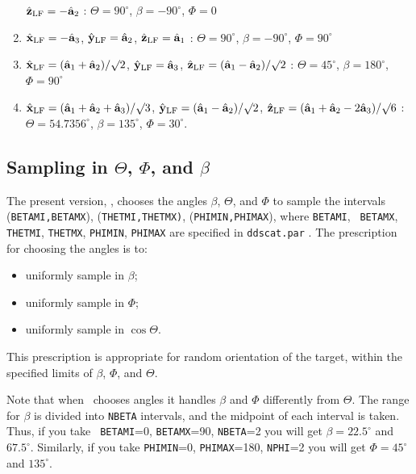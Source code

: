 \begin{enumerate}
     $\hat{\bf z}_{\rm LF}=-{\hat{\bf a}}_2$ : 
	$\Theta= 90^\circ$, $\beta=-90^\circ$, $\Phi=  0$
\item$\hat{\bf x}_{\rm LF}=-{\hat{\bf a}}_3$, 
     $\hat{\bf y}_{\rm LF}= {\hat{\bf a}}_2$, 
     $\hat{\bf z}_{\rm LF}= {\hat{\bf a}}_1$ : 
	$\Theta= 90^\circ$, $\beta=-90^\circ$, $\Phi= 90^\circ$
\item$\hat{\bf x}_{\rm LF}=({\hat{\bf a}}_1+{\hat{\bf a}}_2)/\surd2$, 
     $\hat{\bf y}_{\rm LF}={\hat{\bf a}}_3$, 
     $\hat{\bf z}_{\rm LF}=({\hat{\bf a}}_1-{\hat{\bf a}}_2)/\surd2$ : 
	$\Theta=45^\circ$, $\beta=180^\circ$, $\Phi=90^\circ$
\item$\hat{\bf x}_{\rm LF}=({\hat{\bf a}}_1+{\hat{\bf a}}_2+{\hat{\bf a}}_3)/\surd3$, 
	$\hat{\bf y}_{\rm LF}=({\hat{\bf a}}_1-{\hat{\bf a}}_2)/\surd2$, 
	$\hat{\bf z}_{\rm LF}=({\hat{\bf a}}_1+{\hat{\bf a}}_2-2{\hat{\bf a}}_3)/\surd6$ :\\
	$\Theta=54.7356^\circ$, $\beta=135^\circ$, $\Phi=30^\circ$.
\end{enumerate}

\subsection{ Sampling in $\Theta$, $\Phi$, and $\beta$\label{subsec:sampling}}
The present version, \ddscatv, chooses the angles $\beta$,
$\Theta$, and $\Phi$ to sample the intervals ({\tt BETAMI,BETAMX}),
({\tt THETMI,THETMX)}, ({\tt PHIMIN,PHIMAX}), where {\tt BETAMI}, {\tt
BETAMX}, {\tt THETMI}, {\tt THETMX}, {\tt PHIMIN}, {\tt PHIMAX} are
specified in {\tt ddscat.par} .  The prescription for choosing the
angles is to:
\begin{itemize}
\item uniformly sample in $\beta$;
\item uniformly sample in $\Phi$;
\item uniformly sample in $\cos\Theta$.
\end{itemize}
This prescription is appropriate for random orientation of the target,
within the specified limits of $\beta$, $\Phi$, and $\Theta$.

Note that when \ddscatv\ chooses angles it handles $\beta$ and
$\Phi$ differently from $\Theta$.
The range for $\beta$ is divided into {\tt NBETA} intervals, and the
midpoint of each interval is taken.  Thus, if you take {\tt
BETAMI}=0, {\tt BETAMX}=90, {\tt NBETA}=2 you will get
$\beta=22.5^\circ$ and $67.5^\circ$.  Similarly, if you take
{\tt PHIMIN}=0, {\tt PHIMAX}=180, {\tt NPHI}=2 you will get
$\Phi=45^\circ$ and $135^\circ$.

